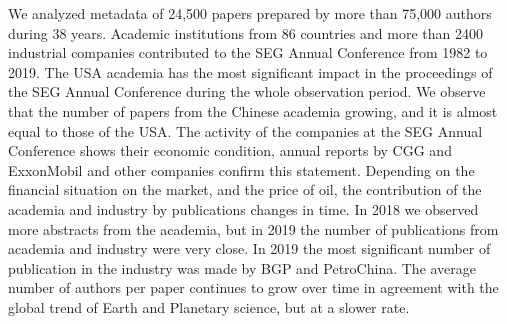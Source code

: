 \documentclass[geosciences,article,submit,moreauthors,pdftex]{Definitions/mdpi}
\begin{document}
We analyzed metadata of 24,500 papers prepared by more than 75,000 authors during 38 years. Academic institutions from 86 countries and more than 2400 industrial companies contributed to the SEG Annual Conference from 1982 to 2019. The USA academia has the most significant impact in the proceedings of the SEG Annual Conference during the whole observation period. We observe that the number of papers from the Chinese academia growing, and it is almost equal to those of the USA. The activity of the companies at the SEG Annual Conference shows their economic condition, annual reports by CGG and ExxonMobil and other companies confirm this statement. Depending on the financial situation on the market, and the price of oil, the contribution of the academia and industry by publications changes in time. In 2018 we observed more abstracts from the academia, but in 2019 the number of publications from academia and industry were very close. In 2019 the most significant number of publication in the industry was made by BGP and PetroChina. The average number of authors per paper continues to grow over time in agreement with the global trend of Earth and Planetary science, but at a slower rate.


\vspace{6pt} 




\end{document}
